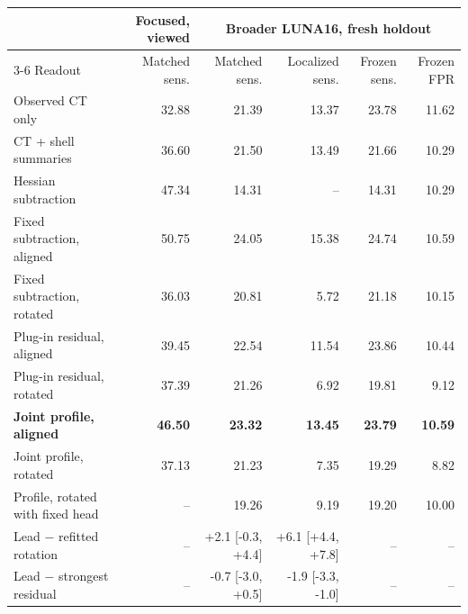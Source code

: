 \begin{tabular}{@{}lrrrrr@{}}
\toprule
& Focused, viewed & \multicolumn{4}{c}{Broader LUNA16, fresh holdout} \\
\cmidrule(lr){3-6}
Readout & Matched sens. & Matched sens. & Localized sens. & Frozen sens. & Frozen FPR \\
\midrule
Observed CT only & 32.88 & 21.39 & 13.37 & 23.78 & 11.62 \\
CT + shell summaries & 36.60 & 21.50 & 13.49 & 21.66 & 10.29 \\
Hessian subtraction & 47.34 & 14.31 & -- & 14.31 & 10.29 \\
Fixed subtraction, aligned & 50.75 & 24.05 & 15.38 & 24.74 & 10.59 \\
Fixed subtraction, rotated & 36.03 & 20.81 & 5.72 & 21.18 & 10.15 \\
Plug-in residual, aligned & 39.45 & 22.54 & 11.54 & 23.86 & 10.44 \\
Plug-in residual, rotated & 37.39 & 21.26 & 6.92 & 19.81 & 9.12 \\
\textbf{Joint profile, aligned} & \textbf{46.50} & \textbf{23.32} & \textbf{13.45} & \textbf{23.79} & \textbf{10.59} \\
Joint profile, rotated & 37.13 & 21.23 & 7.35 & 19.29 & 8.82 \\
Profile, rotated with fixed head & -- & 19.26 & 9.19 & 19.20 & 10.00 \\
\midrule
Lead $-$ refitted rotation & -- & +2.1 [-0.3, +4.4] & +6.1 [+4.4, +7.8] & -- & -- \\
Lead $-$ strongest residual & -- & -0.7 [-3.0, +0.5] & -1.9 [-3.3, -1.0] & -- & -- \\
\bottomrule
\end{tabular}
